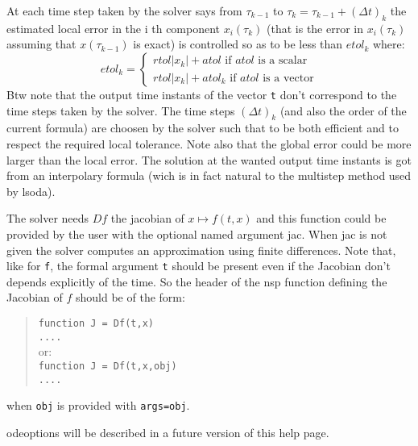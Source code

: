 \begin{mandescription}
At each time step taken by the solver says from $\tau_{k-1}$ to  $\tau_k = \tau_{k-1} + (\Delta t)_k$
the estimated local error in the i th component $x_i(\tau_k)$ (that is the error in 
$x_i(\tau_k)$ assuming that $x(\tau_{k-1})$ is exact) is controlled so as to be less 
than $etol_k$ where:
$$
etol_k =
\left\{
\begin{array}{l}
 rtol | x_k | + atol  \mbox{ if } atol \mbox { is a scalar} \\
 rtol | x_k | + atol_k  \mbox{ if } atol \mbox { is a vector}
\end{array}
\right.
$$
 Btw note that the output time instants  of the vector \verb+t+ don't correspond 
to the time steps taken by the solver. The  time steps $(\Delta t)_k$
(and also the order of the current formula) are choosen by the solver such 
that to be both efficient and to respect the required local tolerance. Note 
also that the global error could be more larger than the local error. The 
solution at the wanted output time instants is got from an interpolary 
formula (wich is in fact natural to the multistep method used by lsoda).

The solver needs $Df$ the jacobian of $x \mapsto f(t,x)$ and this function could be provided by the user with the optional named argument 
jac. When jac is not given the solver computes an approximation using finite differences. Note that, like for \verb+f+, the formal argument
\verb+t+ should be present even if the Jacobian don't depends explicitly of the time. So the header of the nsp 
function defining the Jacobian of $f$ should be of the form:
\begin{quote}
{\tt function J = Df(t,x) \\
      ....}\\
or:\\
{\tt function J = Df(t,x,obj) \\
     ....}
\end{quote}
when {\tt obj} is provided with {\tt args=obj}.

odeoptions will be described in a future version of this help page.

\end{mandescription} 

